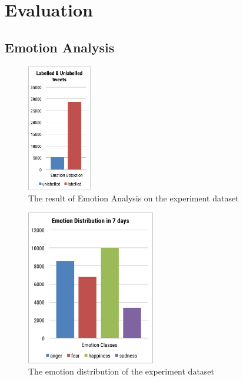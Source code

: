 \section{Evaluation}
\subsection{Emotion Analysis}

\begin{figure}[htb!] 
\centering    
\includegraphics[width=0.25\textwidth]{EmotionLabel}
\caption{The result of Emotion Analysis on the experiment dataset}
\label{fig:emotionLabel}
\end{figure}

\begin{figure}[htb!] 
\centering    
\includegraphics[width=0.5\textwidth]{EmotionDistributionWeek}
\caption{The emotion distribution of the experiment dataset}
\label{fig:emotionDistributionWeek}
\end{figure}

